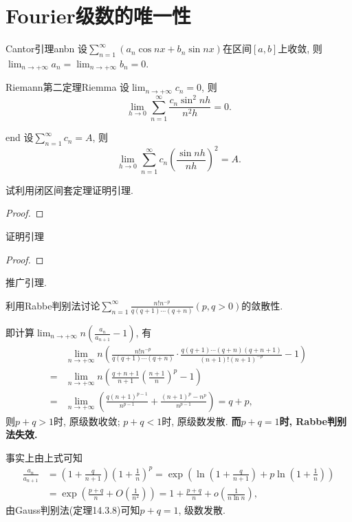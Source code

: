 \section{Fourier级数的唯一性}
\begin{lemma}{Cantor引理}{anbn}
设\(\sum_{n=1}^{\infty}\left(a_n\cos nx+b_n\sin nx\right)\)在区间\([a,b]\)上收敛, 则\(\lim_{n\rightarrow+\infty}a_n=\lim_{n\rightarrow+\infty}b_n=0\).
\end{lemma}
\begin{lemma}{Riemann第二定理}{Riemma}
设\(\lim_{n\rightarrow+\infty}c_n=0\), 则\[\lim_{h\rightarrow 0}\sum_{n=1}^{\infty}\frac{c_n\sin^2nh}{n^2h}=0.\]
\end{lemma}
\begin{lemma}{}{end}
设\(\sum_{n=1}^{\infty}c_n=A\), 则\[\lim_{h\rightarrow 0}\sum_{n=1}^{\infty}c_n\left(\frac{\sin nh}{nh}\right)^2=A.\]
\end{lemma}
\begin{quiza}
\woe 试利用闭区间套定理证明引理.
\begin{proof}

\end{proof}
\woe 证明引理
\begin{proof}

\end{proof}
\end{quiza}
\begin{quizb}
\woe 推广引理.
\begin{solution}

\end{solution}
\woe 利用Rabbe判别法讨论\(\sum_{n=1}^{\infty}\frac{n!n^{-p}}{q(q+1)\cdots(q+n)}(p,q>0)\)的敛散性.
\begin{solution}
即计算\(\lim_{n\to+\infty}n\left(\frac{a_n}{a_{n+1}}-1\right)\), 有\[\begin{split}
&\lim_{n\to+\infty}n\left(\frac{n!n^{-p}}{q(q+1)\cdots(q+n)}\cdot\frac{q(q+1)\cdots(q+n)(q+n+1)}{(n+1)!(n+1)^{-p}}-1\right)\\
=&\lim_{n\to+\infty}n\left(\frac{q+n+1}{n+1}\left(\frac{n+1}{n}\right)^p-1\right)\\
=&\lim_{n\to+\infty}\left(\frac{q(n+1)^{p-1}}{n^{p-1}}+\frac{(n+1)^p-n^p}{n^{p-1}}\right)=q+p,
\end{split}\]
则\(p+q>1\)时, 原级数收敛; \(p+q<1\)时, 原级数发散. \textbf{而\(p+q=1\)时, Rabbe判别法失效.}
\end{solution}
\tcblower
事实上由上式可知\[\begin{split}
\frac{a_n}{a_{n+1}}&=\left(1+\frac{q}{n+1}\right)\left(1+\frac{1}{n}\right)^p=\exp\left(\ln\left(1+\frac{q}{n+1}\right)+p\ln\left(1+\frac{1}{n}\right)\right)\\
&=\exp\left(\frac{p+q}{n}+O\left(\frac{1}{n^2}\right)\right)=1+\frac{p+q}{n}+o\left(\frac{1}{n\ln n}\right),
\end{split}\]
由Gauss判别法(定理14.3.8)可知\(p+q=1\), 级数发散.






\end{quizb}